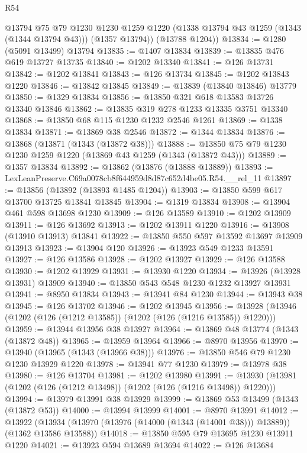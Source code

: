 \begin{lexlean}{R54}
\begin{coremodule}
        @13794
        @75
        @79
        @1230
        @1230
        @1259
        @1220
        (@1338 @13794 @43 @1259 (@1343 (@1344 @13794 @43)))
        (@1357 @13794))
      (@13788 @1204))
@13834 := @1280 (@5091 @13499) @13794
@13835 := @1407 @13834
@13839 := @13835 @476 @619 @13727 @13735
@13840 := @1202 @13340
@13841 := @126 @13731
@13842 := @1202 @13841
@13843 := @126 @13734
@13845 := @1202 @13843 @1220
@13846 := @13842 @13845
@13849 := @13839 (@13840 @13846) @13779
@13850 := @1329 @13834
@13856 := @13850 @321 @618 @13583 @13726 @13340 @13846
@13862 := @13835 @319 @278 @1233 @13335 @3751 @13340
@13868 := @13850 @68 @115 @1230 @1232 @2546 @1261
@13869 := @1338 @13834
@13871 := @13869 @38 @2546
@13872 := @1344 @13834
@13876 := @13868 (@13871 (@1343 (@13872 @38)))
@13888 := @13850 @75 @79 @1230 @1230 @1259 @1220 (@13869 @43 @1259 (@1343 (@13872 @43)))
@13889 := @1357 @13834
@13892 := @13862 (@13876 (@13888 @13889))
@13893 := LexLeanPreserve.C69a0078cb8f644959d8d87c652d4be05.R54.__rel_11
@13897 := @13856 (@13892 (@13893 @1485 @1204))
@13903 := @13850 @599 @617 @13700 @13725 @13841 @13845
@13904 := @1319 @13834
@13908 := @13904 @461 @598 @13698 @1230
@13909 := @126 @13589
@13910 := @1202 @13909
@13911 := @126 @13692
@13913 := @1202 @13911 @1220
@13916 := @13908 (@13910 @13913) @13841
@13922 := @13850 @550 @597 @13592 @13697 @13909 @13913
@13923 := @13904 @120
@13926 := @13923 @549 @1233 @13591
@13927 := @126 @13586
@13928 := @1202 @13927
@13929 := @126 @13588
@13930 := @1202 @13929
@13931 := @13930 @1220
@13934 := @13926 (@13928 @13931) @13909
@13940 := @13850 @543 @548 @1230 @1232 @13927 @13931
@13941 := @8950 @13834
@13943 := @13941 @84 @1230
@13944 := @13943 @38
@13945 := @126 @13702
@13946 := @1202 @13945
@13956 := @13928 (@13946 (@1202 (@126 (@1212 @13585)) (@1202 (@126 (@1216 @13585)) @1220)))
@13959 := @13944 @13956 @38 @13927
@13964 := @13869 @48 @13774 (@1343 (@13872 @48))
@13965 := @13959 @13964
@13966 := @8970 @13956
@13970 := @13940 (@13965 (@1343 (@13966 @38)))
@13976 := @13850 @546 @79 @1230 @1230 @13929 @1220
@13978 := @13941 @77 @1230
@13979 := @13978 @38
@13980 := @126 @13704
@13981 := @1202 @13980
@13991 := @13930 (@13981 (@1202 (@126 (@1212 @13498)) (@1202 (@126 (@1216 @13498)) @1220)))
@13994 := @13979 @13991 @38 @13929
@13999 := @13869 @53 @13499 (@1343 (@13872 @53))
@14000 := @13994 @13999
@14001 := @8970 @13991
@14012 := @13922
    (@13934 (@13970 (@13976 (@14000 (@1343 (@14001 @38))) @13889)) (@1362 @13586 @13588))
@14018 := @13850 @595 @79 @13695 @1230 @13911 @1220
@14021 := @13923 @594 @13689 @13694
@14022 := @126 @13684

\end{coremodule}
\end{lexlean}
